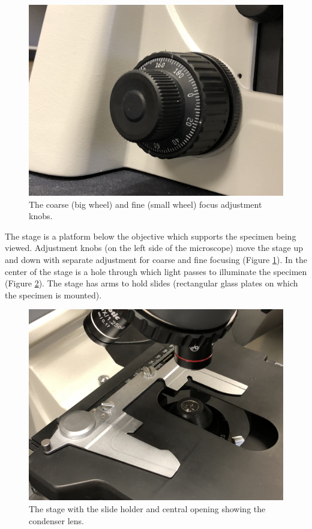 \begin{figure}

{\centering \includegraphics[width=0.7\linewidth]{./figures/microscope/focus} 

}

\caption{The coarse (big wheel) and fine (small wheel) focus adjustment knobs.}\label{fig:focus}
\end{figure}

The stage is a platform below the objective which supports the specimen being viewed. Adjustment knobs (on the left side of the microscope) move the stage up and down with separate adjustment for coarse and fine focusing (Figure \ref{fig:focus}). In the center of the stage is a hole through which light passes to illuminate the specimen (Figure \ref{fig:stage}). The stage has arms to hold slides (rectangular glass plates on which the specimen is mounted).

\begin{figure}

{\centering \includegraphics[width=0.7\linewidth]{./figures/microscope/stage} 

}

\caption{The stage with the slide holder and central opening showing the condenser lens.}\label{fig:stage}
\end{figure}

